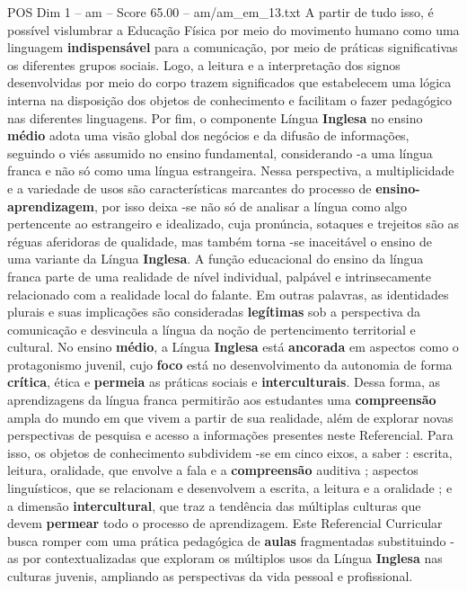 \begin{textsample}{POS Dim 1 – am – Score 65.00 – am/am\_em\_13.txt}
A partir de tudo isso, é possível vislumbrar a Educação Física por meio do movimento humano como uma linguagem \textbf{indispensável} para a comunicação, por meio de práticas significativas os diferentes grupos sociais.
Logo, a leitura e a interpretação dos signos desenvolvidas por meio do corpo trazem significados que estabelecem uma lógica interna na disposição dos objetos de conhecimento e facilitam o fazer pedagógico nas diferentes linguagens.
Por fim, o componente Língua \textbf{Inglesa} no ensino \textbf{médio} adota uma visão global dos negócios e da difusão de informações, seguindo o viés assumido no ensino fundamental, considerando -a uma língua franca e não só como uma língua estrangeira.
Nessa perspectiva, a multiplicidade e a variedade de usos são características marcantes do processo de \textbf{ensino-aprendizagem}, por isso deixa -se não só de analisar a língua como algo pertencente ao estrangeiro e idealizado, cuja pronúncia, sotaques e trejeitos são as réguas aferidoras de qualidade, mas também torna -se inaceitável o ensino de uma variante da Língua \textbf{Inglesa}.
A função educacional do ensino da língua franca parte de uma realidade de nível individual, palpável e intrinsecamente relacionado com a realidade local do falante.
Em outras palavras, as identidades plurais e suas implicações são consideradas \textbf{legítimas} sob a perspectiva da comunicação e desvincula a língua da noção de pertencimento territorial e cultural.
No ensino \textbf{médio}, a Língua \textbf{Inglesa} está \textbf{ancorada} em aspectos como o protagonismo juvenil, cujo \textbf{foco} está no desenvolvimento da autonomia de forma \textbf{crítica}, ética e \textbf{permeia} as práticas sociais e \textbf{interculturais}.
Dessa forma, as aprendizagens da língua franca permitirão aos estudantes uma \textbf{compreensão} ampla do mundo em que vivem a partir de sua realidade, além de explorar novas perspectivas de pesquisa e acesso a informações presentes neste Referencial.
Para isso, os objetos de conhecimento subdividem -se em cinco eixos, a saber : escrita, leitura, oralidade, que envolve a fala e a \textbf{compreensão} auditiva ; aspectos linguísticos, que se relacionam e desenvolvem a escrita, a leitura e a oralidade ; e a dimensão \textbf{intercultural}, que traz a tendência das múltiplas culturas que devem \textbf{permear} todo o processo de aprendizagem.
Este Referencial Curricular busca romper com uma prática pedagógica de \textbf{aulas} fragmentadas substituindo -as por contextualizadas que exploram os múltiplos usos da Língua \textbf{Inglesa} nas culturas juvenis, ampliando as perspectivas da vida pessoal e profissional.

\end{textsample}
